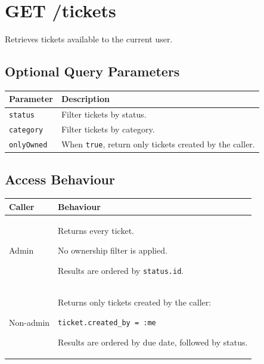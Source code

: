 \documentclass[11pt,a4paper]{article}
\begin{document}
\clearpage
\section{GET /tickets}

Retrieves tickets available to the current user.

\subsection{Optional Query Parameters}

\begin{longtable}{@{}p{3.0cm}p{13.18cm}@{}}
\toprule
\textbf{Parameter} & \textbf{Description} \\
\midrule
\endhead

\texttt{status} &
Filter tickets by status.
\\

\texttt{category} &
Filter tickets by category.
\\

\texttt{onlyOwned} &
When \texttt{true}, return only tickets created by the caller.
\\

\bottomrule
\end{longtable}


\subsection{Access Behaviour}

\begin{longtable}{@{}p{3.0cm}p{13.18cm}@{}}
\toprule
\textbf{Caller} & \textbf{Behaviour} \\
\midrule
\endhead

Admin &
Returns every ticket.

No ownership filter is applied.

Results are ordered by \texttt{status.id}.
\\[4pt]

Non-admin &
Returns only tickets created by the caller:

\texttt{ticket.created\_by = :me}

Results are ordered by due date, followed by status.
\\

\bottomrule
\end{longtable}
\end{document}
